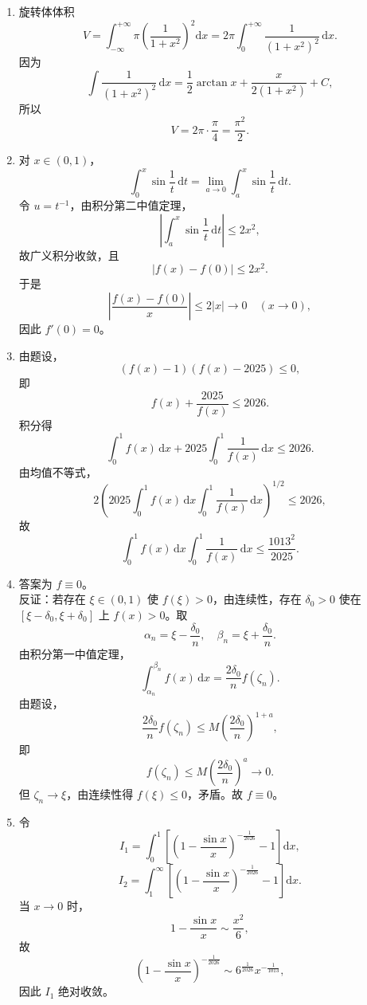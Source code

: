 \begin{enumerate}
    \item 旋转体体积
    \[
    V = \int_{-\infty}^{+\infty} \pi \left(\frac{1}{1 + x^2}\right)^2 \mathrm{d}x
    = 2\pi \int_0^{+\infty} \frac{1}{(1 + x^2)^2}\,\mathrm{d}x.
    \]
    因为
    \[
    \int \frac{1}{(1 + x^2)^2}\,\mathrm{d}x
    = \frac{1}{2} \arctan x + \frac{x}{2(1 + x^2)} + C,
    \]
    所以
    \[
    V = 2\pi \cdot \frac{\pi}{4} = \frac{\pi^2}{2}.
    \]

    \item 对 $x \in (0,1)$，
    \[
    \int_0^x \sin \frac{1}{t}\,\mathrm{d}t
    = \lim_{a \to 0} \int_a^x \sin \frac{1}{t}\,\mathrm{d}t.
    \]
    令 $u = t^{-1}$，由积分第二中值定理，
    \[
    \left| \int_a^x \sin \frac{1}{t}\,\mathrm{d}t \right| \leq 2x^2,
    \]
    故广义积分收敛，且
    \[
    \left| f(x) - f(0) \right| \leq 2x^2.
    \]
    于是
    \[
    \left| \frac{f(x) - f(0)}{x} \right| \leq 2|x| \to 0 \quad (x \to 0),
    \]
    因此 $f'(0) = 0$。

    \item 由题设，
    \[
    (f(x) - 1)(f(x) - 2025) \leq 0,
    \]
    即
    \[
    f(x) + \frac{2025}{f(x)} \leq 2026.
    \]
    积分得
    \[
    \int_0^1 f(x)\,\mathrm{d}x + 2025 \int_0^1 \frac{1}{f(x)}\,\mathrm{d}x \leq 2026.
    \]
    由均值不等式，
    \[
    2 \left( 2025 \int_0^1 f(x)\,\mathrm{d}x \int_0^1 \frac{1}{f(x)}\,\mathrm{d}x \right)^{1/2}
    \leq 2026,
    \]
    故
    \[
    \int_0^1 f(x)\,\mathrm{d}x \int_0^1 \frac{1}{f(x)}\,\mathrm{d}x
    \leq \frac{1013^2}{2025}.
    \]

    \item 答案为 $f \equiv 0$。\\
    反证：若存在 $\xi \in (0,1)$ 使 $f(\xi) > 0$，由连续性，存在 $\delta_0 > 0$ 使在 $[\xi - \delta_0, \xi + \delta_0]$ 上 $f(x) > 0$。取
    \[
    \alpha_n = \xi - \frac{\delta_0}{n}, \quad \beta_n = \xi + \frac{\delta_0}{n}.
    \]
    由积分第一中值定理，
    \[
    \int_{\alpha_n}^{\beta_n} f(x)\,\mathrm{d}x = \frac{2\delta_0}{n} f(\zeta_n).
    \]
    由题设，
    \[
    \frac{2\delta_0}{n} f(\zeta_n) \leq M \left( \frac{2\delta_0}{n} \right)^{1+a},
    \]
    即
    \[
    f(\zeta_n) \leq M \left( \frac{2\delta_0}{n} \right)^a \to 0.
    \]
    但 $\zeta_n \to \xi$，由连续性得 $f(\xi) \leq 0$，矛盾。故 $f \equiv 0$。

    \item 令
    \[
    I_1 = \int_0^1 \left[ \left(1 - \frac{\sin x}{x}\right)^{-\frac{1}{2026}} - 1 \right] \mathrm{d}x,
    \]
    \[
    I_2 = \int_1^\infty \left[ \left(1 - \frac{\sin x}{x}\right)^{-\frac{1}{2026}} - 1 \right] \mathrm{d}x.
    \]
    当 $x \to 0$ 时，
    \[
    1 - \frac{\sin x}{x} \sim \frac{x^2}{6},
    \]
    故
    \[
    \left(1 - \frac{\sin x}{x}\right)^{-\frac{1}{2026}}
    \sim 6^{\frac{1}{2026}} x^{-\frac{1}{1013}},
    \]
    因此 $I_1$ 绝对收敛。


\end{enumerate}
